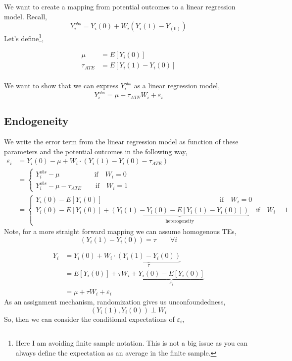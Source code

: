 \documentclass[
  letterpaper,
  DIV=11,
  numbers=noendperiod]{scrreprt}
\theoremstyle{definition}
\theoremstyle{remark}
\begin{document}
We want to create a mapping from potential outcomes to a linear
regression model. Recall, \[
            Y^{obs}_i = Y_i(0)+W_i(Y_i(1)-Y_(0))
\] Let's define\footnote{Here I am avoiding finite sample notation. This
  is not a big issue as you can always define the expectation as an
  average in the finite sample.},

\[
        \begin{align*}
            \mu &=E[Y_i(0)] \\
            \tau_{ATE} &= E[Y_i(1)-Y_i(0)]
        \end{align*}
\]\\
We want to show that we can express \(Y^{obs}_i\) as a linear regression
model, \[
            Y^{obs}_i=\mu+\tau_{ATE}W_i+\varepsilon_i
\]

\subsection{Endogeneity}\label{endogeneity}

We write the error term from the linear regression model as function of
these parameters and the potential outcomes in the following way, \[
        \begin{align*}
            \varepsilon_i   &=Y_i(0)- \mu+W_i\cdot(Y_i(1)-Y_i(0)-\tau_{ATE}) \\
                            &=\begin{cases*}
                                Y^{obs}_i-\mu \qquad\qquad\quad \text{if}\quad W_i=0 \\
                                Y^{obs}_i-\mu-\tau_{ATE} \qquad \text{if}\quad W_i=1
                            \end{cases*} \\
                            &=\begin{cases*}
                                Y_i(0)-E[Y_i(0)] \qquad\qquad\qquad\qquad\qquad\qquad\qquad\qquad\quad \text{if}\quad W_i=0 \\
                                Y_i(0)-E[Y_i(0)]+\underbrace{\left(Y_i(1)-Y_i(0)-E[Y_i(1)-Y_i(0)]\right)}_\text{heterogeneity} \quad \text{if}\quad W_i=1
                            \end{cases*}                        
        \end{align*}
\] Note, for a more straight forward mapping we can assume homogenous
TEs, \[
            (Y_i(1)-Y_i(0)) = \tau\qquad \forall i
\]

\[
\begin{align}
            Y_i &= Y_i(0)+W_i\cdot\underbrace{(Y_i(1)-Y_i(0))}_{\tau} \\
                &=E[Y_i(0)]+\tau W_i+\underbrace{Y_i(0)-E[Y_i(0)]}_{\varepsilon_i} \\
                &=\mu+\tau W_i + \varepsilon_i
\end{align}
\] As an assignment mechanism, randomization gives us unconfoundedness,
\[
            (Y_i(1),Y_i(0))\perp W_i
\] So, then we can consider the conditional expectations of
\(\varepsilon_i\),
\end{document}

